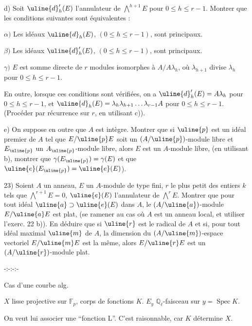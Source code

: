d) Soit $\uline{d}'_h(E)$ l'annulateur de $\bigwedge^{h+1}E$ pour $0\le h\le r-1$. Montrer que les conditions suivantes sont équivalentes :

$\alpha)$ Les idéaux $\uline{d}_h(E)$, $(0\le h\le r-1)$, sont principaux.

$\beta)$ Les idéaux $\uline{d}'_h(E)$, $(0\le h\le r-1)$, sont principaux.

$\gamma)$ $E$ est somme directe de $r$ modules isomorphes à $A/A\lambda_h$, où $\lambda_{h+1}$ divise $\lambda_h$ pour $0\le h\le r-1$.

En outre, lorsque ces conditions sont vérifiées, on a $\uline{d}'_h(E)=A\lambda_h$ pour $0\le h\le r-1$, et $\uline{d}_h(E)=\lambda_h\lambda_{h+1}\ldots\lambda_{r-1}A$ pour $0\le h\le r-1$. (Procéder par récurrence sur $r$, en utilisant c)).

e) On suppose en outre que $A$ est intègre. Montrer que si $\uline{p}$ est un idéal premier de $A$ tel que $E/\uline{p}E$ soit un $(A/\uline{p})$-module libre et $E_{\uline{p}}$ un $A_{\uline{p}}$-module libre, alors $E$ est un $A$-module libre, (en utilisant b), montrer que $\gamma(E_{\uline{p}})=\gamma(E)$ et que $\uline{e}(E_{\uline{p}})=\uline{e}(E)$).

23) Soient $A$ un anneau, $E$ un $A$-module de type fini, $r$ le plus petit des entiers $k$ tels que $\bigwedge^{r+1}E=0$, $\uline{e}(E)$ l'annulateur de $\bigwedge^rE$. Montrer que pour tout idéal $\uline{a}\supset\uline{e}(E)$ dans $A$, le $(A/\uline{a})$-module $E/\uline{a}E$ est plat, (se ramener au cas où $A$ est un anneau local, et utiliser l'exerc. 22 b)). En déduire que si $\uline{r}$ est le radical de $A$ et si, pour tout idéal maximal $\uline{m}$ de $A$, la dimension du $(A/\uline{m})$-espace vectoriel $E/\uline{m}E$ est la même, alors $E/\uline{r}E$ est un $(A/\uline{r})$-module plat.
\begin{center}-:-:-:-\end{center}
Cas d'une courbe alg.

$X$  lisse projective  sur $\mathbb F_p$,  corps de fonctions $K$.
$E_y$ $\mathbb Q_\ell$-faisceau  sur $y=\operatorname{Spec}K$.

On veut lui associer une ``fonction L''. C'est raisonnable, car $K$ détermine $X$.

